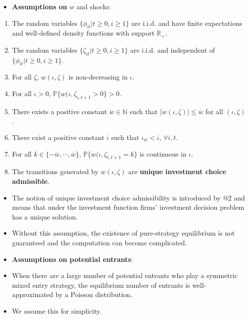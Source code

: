 \documentclass[
]{book}
\providecommand{\tightlist}{%
  \setlength{\itemsep}{0pt}\setlength{\parskip}{0pt}}
\begin{document}
\begin{itemize}
\tightlist
\item
  \textbf{Assumptions on} \(w\) and shocks:
\end{itemize}

\begin{enumerate}
\def\labelenumi{\arabic{enumi}.}
\tightlist
\item
  The random variables \(\{\phi_{it}| t \ge 0, i \ge 1\}\) are i.i.d.
  and have finite expectations and well-defined density functions with
  support \(\mathbb{R}_+\).
\item
  The random variables \(\{\zeta_{it}| t \ge 0, i \ge 1\}\) are i.i.d.
  and independent of \(\{\phi_{it}| t \ge 0, i \ge 1\}\).
\item
  For all \(\zeta\), \(w(\iota, \zeta)\) is non-decreasing in \(\iota\).
\item
  For all \(\iota > 0\),
  \(\mathbb{P}\{w(\iota, \zeta_{i, t + 1} > 0\} > 0\).
\item
  There exists a positive constant \(\overline{w} \in \mathbb{N}\) such
  that \(|w(\iota, \zeta)| \le \overline{w}\) for all \((\iota, \zeta)\).
\item
  There exist a positive constant \(\overline{\iota}\) such that
  \(\iota_{it} < \overline{\iota}\), \(\forall i, t\).
\item
  For all \(k \in \{- \overline{w}, \cdots, \overline{w}\}\),
  \(\mathbb{P}\{w(\iota, \zeta_{i, t + 1} = k\}\) is continuous in
  \(\iota\).
\item
  The transitions generated by \(w(\iota, \zeta)\) are \textbf{unique
  investment choice admissible}.
\end{enumerate}

\begin{itemize}
\tightlist
\item
  The notion of unique investment choice admissibility is introduced
  by @2 and means that
  under the investment function firms' investment decision problem has
  a unique solution.
\item
  Without this assumption, the existence of pure-strategy equilibrium
  is not guaranteed and the computation can become complicated.
\item
  \textbf{Assumptions on potential entrants}:
\item
  When there are a large number of potential entrants who play a
  symmetric mixed entry strategy, the equilibrium number of entrants
  is well-approximated by a Poisson distribution.
\item
  We assume this for simplicity.
\end{itemize}
\end{document}
